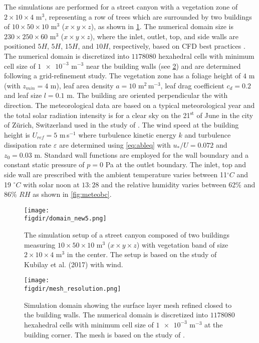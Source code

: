The simulations are performed for a street canyon with a vegetation zone of $2 \times 10 \times 4$ m$^3$, representing a row of trees which are surrounded by two buildings of $10 \times 50 \times 10$ m$^3$ ($x\times y \times z$), as shown in \cref{fig:domain_new5}. The numerical domain size is $230\times 250 \times 60$ m$^3$  ($x\times y \times z$), where the inlet, outlet, top, and side walls are positioned $5 H$, $5 H$, $15 H$, and $10 H$, respectively, based on CFD best practices \citep{Blocken2015, Franke2007, Tominaga2008}. The numerical domain is discretized into $\num{1178080}$ hexahedral cells with minimum cell size of $\num{1e-3}$ m$^{-3}$ near the building walls (see \cref{fig:mesh_resolution}) and are determined following a grid-refinement study. The vegetation zone has a foliage height of $4$ m (with $z_{\textit{min}}= 4$ m), leaf area density $a= 10$ m$^2$\,m$^{-3}$, leaf drag coefficient $c_d=0.2$ and leaf size $l=0.1$ m. The building are oriented perpendicular the with direction. The meteorological data are based on a typical meteorological year and the total solar radiation intensity is for a clear sky on the 21$^{\mathrm{st}}$ of June in the city of Z\"urich, Switzerland used in the study of \cite{Kubilay2018}. The wind speed at the building height is $U_{\textit{ref}}=5$ m\,s$^{-1}$ where turbulence kinetic energy $k$ and turbulence dissipation rate $\varepsilon$ are determined using \cref{eq:ableq} \citep{Richards1993} with $u_*/U = 0.072$ and $z_0 = 0.03$ m. Standard wall functions are employed for the wall boundary and a constant static pressure of $p=0$ Pa at the outlet boundary. The inlet, top and side wall are prescribed with the ambient temperature varies between 11$^{\circ}C$ and 19 $^{\circ}C$ with solar noon at $13:28$ and the relative humidity varies between 62\% and 86\% $RH$ as shown in \cref{fig:meteobc}. 

	\begin{figure}[t]
	\centering
	\texttt{[image: \\figdir/domain\_new5.png]}
	\caption{The simulation setup of a street canyon composed of two buildings measuring $10 \times 50 \times 10$ m$^3$ ($x\times y \times z$) with vegetation band of size $2 \times 10 \times 4$ m$^3$ in the center. The setup is based on the study of Kubilay et al. (2017) with wind.}
	\label{fig:domain_new5}
	\end{figure}


\begin{figure}[p]
	\centering
	\texttt{[image: \\figdir/mesh\_resolution.png]}
	\caption{Simulation domain showing the surface layer mesh refined closed to the building walls. The numerical domain is discretized into $\num{1178080}$ hexahedral cells with minimum cell size of $\num{1e-3}$ m$^{-3}$ at the building corner. The mesh is based on the study of \cite{Kubilay2018}.}
	\label{fig:mesh_resolution}
\end{figure}

